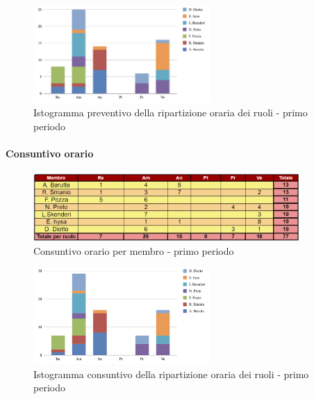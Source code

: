 \begin{figure}[H]
    \centering
    \includegraphics[width=0.6\textwidth]{../Images/preventivoDivisioneRuoli1Periodo.png}
    \caption{Istogramma preventivo della ripartizione oraria dei ruoli - primo periodo}
    \label{fig:PvD1}
\end{figure}

\paragraph{Consuntivo orario } \hspace{1pt}

\begin{figure}[ht]
    \centering
    \includegraphics[width=0.9\textwidth]{../Images/consuntivoOrario1Periodo.png}
    \caption{Consuntivo orario per membro - primo periodo}
    \label{fig:Cv1}
\end{figure}

\begin{figure}[H]
    \centering
    \includegraphics[width=0.6\textwidth]{../Images/consuntivoDivisioneRuoli1Periodo.png}
    \caption{Istogramma consuntivo della ripartizione oraria dei ruoli - primo periodo}
    \label{fig:CD1}
\end{figure}




